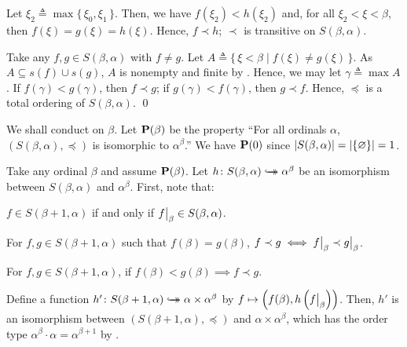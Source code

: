 \documentclass[../introduction_to_set_theory_Note.tex]{subfiles}
\begin{document}
{{\begin{itemize}[nolistsep, leftmargin=*, listparindent=\parindent]
        Let \(\xi_2 \triangleq \max \{\,\xi_0, \xi_1\,\}\).
        Then, we have \(f(\xi_2) < h(\xi_2)\) and,
        for all \(\xi_2 < \xi < \beta\), then \(f(\xi) = g(\xi) = h(\xi)\).
        Hence, \(f \prec h\); \(\prec\) is transitive on \(S(\beta, \alpha)\). \checkmark

        \ii
        Take any \(f, g \in S(\beta, \alpha)\) with \(f \neq g\).
        Let \(A \triangleq \{\,\xi < \beta \mid f(\xi) \neq g(\xi)\,\}\).
        As \(A \subseteq s(f) \cup s(g)\), \(A\) is nonempty and finite by
        .
        Hence, we may let \(\gamma \triangleq \max A\).
        If \(f(\gamma) < g(\gamma)\), then \(f \prec g\);
        if \(g(\gamma) < f(\gamma)\), then \(g \prec f\).
        Hence, \(\preceq\) is a total ordering of \(S(\beta, \alpha)\). \checkmark \qed
    \end{itemize}
    }

    We shall conduct  on \(\beta\).
    Let \(\bm{\mathrm{P}}(\beta)\) be the property
    ``For all ordinals \(\alpha\), \((S(\beta, \alpha), \preceq)\)
    is isomorphic to \(\alpha^\beta\).''
    We have \(\bm{\mathrm{P}}(0)\) since \(|S(\beta, \alpha)| = |\{\varnothing\}| = 1\).

    Take any ordinal \(\beta\) and assume \(\bm{\mathrm{P}}(\beta)\).
    Let \(h \colon S(\beta, \alpha) \hookrightarrow\mathrel{\mspace{-15mu}}\rightarrow \alpha^\beta\)
    be an isomorphism between \(S(\beta, \alpha)\) and \(\alpha^\beta\).
    First, note that:
    \begin{itemize}[nolistsep, leftmargin=*, listparindent=\parindent]
        \ii
        \(f \in S(\beta + 1, \alpha)\)
        if and only if \(\restr{f}{\beta} \in S(\beta, \alpha)\).

        \ii
        For \(f, g \in S(\beta + 1, \alpha)\) such that \(f(\beta) = g(\beta)\),
        \(f \prec g \iff \restr{f}{\beta} \prec \restr{g}{\beta}\).

        \ii
        For \(f, g \in S(\beta + 1, \alpha)\),
        if \(f(\beta) < g(\beta) \implies f \prec g\).
    \end{itemize}

    Define a function \(h' \colon S(\beta + 1, \alpha) \hookrightarrow\mathrel{\mspace{-15mu}}\rightarrow \alpha \times \alpha^\beta\)
    by \(f \mapsto \left(f(\beta), h\left(\restr{f}{\beta}\right)\right)\).
    Then, \(h'\) is an isomorphism between \((S(\beta + 1, \alpha), \preceq)\) and \(\alpha \times \alpha^\beta\),
    which has the order type \(\alpha^\beta \cdot \alpha = \alpha^{\beta + 1}\)
    by .

}
\end{document}
